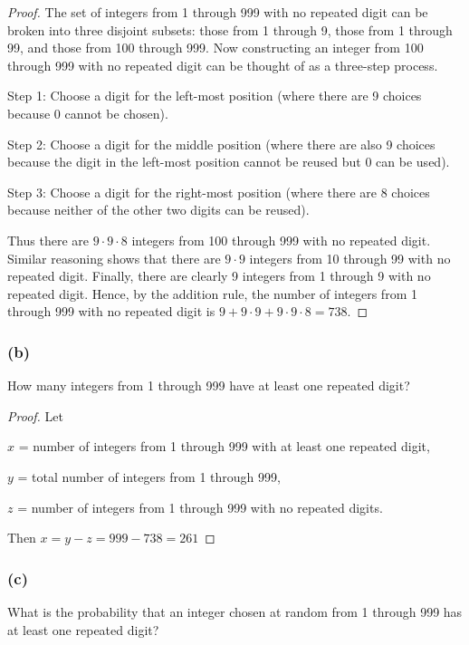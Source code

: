 \documentclass[14pt]{extarticle}
\newcommand{\cy}{\color{cyan}}
\begin{document}
\begin{proof}
     The set of integers from 1 through 999 with no repeated digit can be broken into three disjoint subsets: those from
     1 through 9, those from 1 through 99, and those from 100 through 999. Now constructing an integer from 100 through
     999 with no repeated digit can be thought of as a three-step process.

          {\cy Step 1:} Choose a digit for the left-most position (where there are 9 choices because 0 cannot be chosen).

          {\cy Step 2:} Choose a digit for the middle position (where there are also 9 choices because the digit in the left-most
     position cannot be reused but 0 can be used).

          {\cy Step 3:} Choose a digit for the right-most position (where there are 8 choices because neither of the other two
     digits can be reused).

     Thus there are \(9 \cdot 9 \cdot 8\) integers from 100 through 999 with no repeated digit. Similar reasoning shows
     that there are \(9 \cdot 9\) integers from 10 through 99 with no repeated digit. Finally, there are clearly 9
     integers from 1 through 9 with no repeated digit. Hence, by the addition rule, the number of integers from 1 through
     999 with no repeated digit is \(9 + 9 \cdot 9 + 9 \cdot 9 \cdot 8 = 738\).
\end{proof}

\subsubsection{(b)}
How many integers from 1 through 999 have at least one repeated digit?

\begin{proof}
     Let

     $x$ = number of integers from 1 through 999 with at least one repeated digit,

     $y$ = total number of integers from 1 through 999,

     $z$ = number of integers from 1 through 999 with no repeated digits.

     Then \(x = y - z = 999 - 738 = 261\)
\end{proof}

\subsubsection{(c)}
What is the probability that an integer chosen at random from 1 through 999 has at least one repeated digit?
\end{document}
